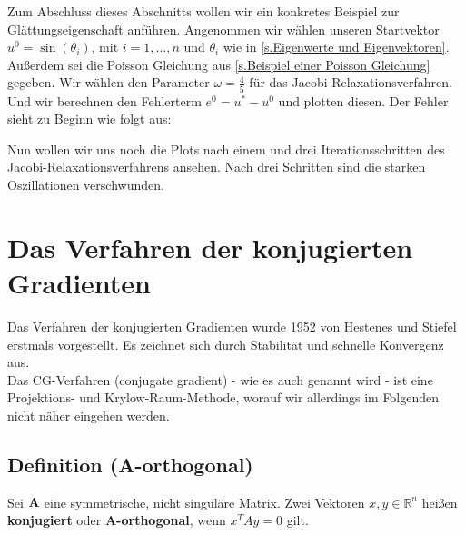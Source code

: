 \label{img.Jacobi3}

Zum Abschluss dieses Abschnitts wollen wir ein konkretes Beispiel zur Glättungseigenschaft anführen. Angenommen wir wählen unseren Startvektor $u^{0} = \sin(\theta_{i})$, mit $i = 1,...,n$ und $\theta_{i}$ wie in \autoref{s.Eigenwerte und Eigenvektoren}. Außerdem sei die Poisson Gleichung aus \autoref{s.Beispiel einer Poisson Gleichung} gegeben. Wir wählen den Parameter $\omega = \frac{4}{5}$ für das Jacobi-Relaxationsverfahren. Und wir berechnen den Fehlerterm $e^{0} = u^{*} - u^{0}$ und plotten diesen. Der Fehler sieht zu Beginn wie folgt aus:


Nun wollen wir uns noch die Plots nach einem und drei Iterationsschritten des Jacobi-Relaxationsverfahrens ansehen. Nach drei Schritten sind die starken Oszillationen verschwunden.


\section{Das Verfahren der konjugierten Gradienten}\label{s.Das Verfahren der konjugierten Gradienten}

Das Verfahren der konjugierten Gradienten wurde 1952 von Hestenes und Stiefel erstmals vorgestellt. Es zeichnet sich durch Stabilität und schnelle Konvergenz aus. \\
Das CG-Verfahren (conjugate gradient) - wie es auch genannt wird - ist eine Projektions- und Krylow-Raum-Methode, worauf wir allerdings im Folgenden nicht näher eingehen werden.

\subsection{Definition (A-orthogonal)}\label{ss.A-orthogonal}
Sei ${\textbf{A}}$ eine symmetrische, nicht singuläre Matrix. Zwei Vektoren $x,y \in \mathbb{R}^{n}$ heißen \textbf{konjugiert} oder \textbf{A-orthogonal}, wenn $x^{T}Ay = 0$ gilt.\\

